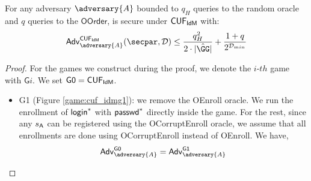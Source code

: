 \begin{theorem}
    For any adversary $\adversary{A}$ bounded to $q_H$ queries to the random oracle and $q$ queries to the $\mathsf{OOrder}$, \construction is secure under $\mathsf{CUF}_{\textsf{IdM}}$ with:
    \begin{align*}
    \advtg_\adversary{A}^{\cuf_\idm}(\secpar, \mathcal{D})  \le \frac{q_H^2}{2\cdot |\GGhat|} + \frac{1+q}{2^{\mathcal{D}_{min}}}
\end{align*}
    
\end{theorem}

\begin{proof}
    For the games we construct during the proof, we denote the $i$-$th$ game with $\mathsf{G}i$. We set $\mathsf{G0} = \mathsf{CUF}_{\textsf{IdM}}$.

    \begin{itemize}
        \item \textsf{G1} (Figure \ref{game:cuf_idmg1}): we remove the \textsf{OEnroll} oracle. We run the enrollment of $\mathsf{login}^*$ with $\textsf{passwd}^*$ directly inside the game. For the rest, since any $s_\mathsf{A}$ can be registered using the \textsf{OCorruptEnroll} oracle, we assume that all enrollments are done using \textsf{OCorruptEnroll} instead of \textsf{OEnroll}. We have, 
        \begin{align*}
            \advtg_\adversary{A}^{\mathsf{G0}} = \advtg_\adversary{A}^{\mathsf{G1}}\\
        \end{align*}


\end{itemize}
\end{proof}
